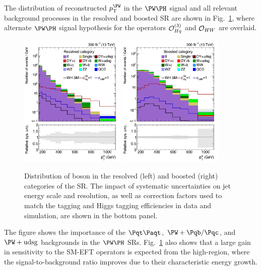 \documentclass[a4paper,11pt]{article}
\newcommand{\Pb}{{{\Pqb}}\xspace}
\newcommand{\Pt}{{{\Pqt}}\xspace}
\newcommand{\Pc}{{{\Pqc}}\xspace}
\newcommand{\PAt}{{{{\Paqt}}}\xspace}
\begin{document}
The distribution of reconstructed $\pt^{\PW}$ in the $\PW\PH$ signal and all relevant background processes in the resolved and boosted SR are shown in Fig.~\ref{fig:RECO_Vpt_WH}, where alternate $\PW\PH$ signal hypothesis for the operators ${\cal O}^{(3)}_{Hq}$ and ${\cal O}_{HW}$  are overlaid. 
\begin{figure}[hbtp]
\begin{center}
\includegraphics[width=0.45\textwidth]{Figures/New/RECO/Plot_Resolved_SR_V_pt_WH.png}
\includegraphics[width=0.45\textwidth]{Figures/New/RECO/Plot_Boosted_SR_V_pt_WH.png}
\end{center}
\caption{
Distribution of \PW boson \pt in the resolved (left) and boosted (right) categories of the SR. The impact of systematic uncertainties on jet energy scale and resolution, as well as correction factors used to match the \Pb tagging and Higgs tagging efficiencies in data and simulation, are shown in the bottom panel.
}
\label{fig:RECO_Vpt_WH}
\end{figure}
The figure shows the importance of the $\Pt\PAt$, ${\PW}+\Pb/\Pc$, and ${\PW}+\textrm{udsg}$ backgrounds in the $\PW\PH$ SRs.
Fig.~\ref{fig:RECO_Vpt_WH} also shows that a large gain in sensitivity to the SM-EFT operators is expected from the high-\pt region, where the signal-to-background ratio improves due to their characteristic energy growth.
\end{document}
